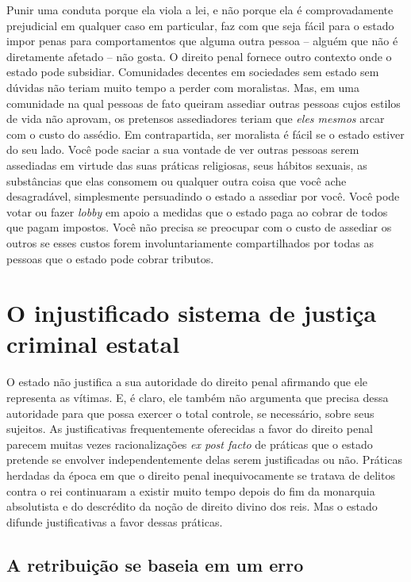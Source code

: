 Punir uma conduta porque ela viola a lei, e não porque ela é comprovadamente prejudicial em qualquer caso em particular, faz com que seja fácil para o estado impor penas para comportamentos que alguma outra pessoa -- alguém que não é diretamente afetado -- não gosta. O direito penal fornece outro contexto onde o estado pode subsidiar. Comunidades decentes em sociedades sem estado sem dúvidas não teriam muito tempo a perder com moralistas. Mas, em uma comunidade na qual pessoas de fato queiram assediar outras pessoas cujos estilos de vida não aprovam, os pretensos assediadores teriam que \emph{eles mesmos} arcar com o custo do assédio. Em contrapartida, ser moralista é fácil se o estado estiver do seu lado. Você pode saciar a sua vontade de ver outras pessoas serem assediadas em virtude das suas práticas religiosas, seus hábitos sexuais, as substâncias que elas consomem ou qualquer outra coisa que você ache desagradável, simplesmente persuadindo o estado a assediar por você. Você pode votar ou fazer \emph{lobby} em apoio a medidas que o estado paga ao cobrar de todos que pagam impostos. Você não precisa se preocupar com o custo de assediar os outros se esses custos forem involuntariamente compartilhados por todas as pessoas que o estado pode cobrar tributos.

\section{O injustificado sistema de justiça criminal estatal}

O estado não justifica a sua autoridade do direito penal afirmando que ele representa as vítimas. E, é claro, ele também não argumenta que precisa dessa autoridade para que possa exercer o total controle, se necessário, sobre seus sujeitos. As justificativas frequentemente oferecidas a favor do direito penal parecem muitas vezes racionalizações \emph{ex post facto} de práticas que o estado pretende se envolver independentemente delas serem justificadas ou não. Práticas herdadas da época em que o direito penal inequivocamente se tratava de delitos contra o rei continuaram a existir muito tempo depois do fim da monarquia absolutista e do descrédito da noção de direito divino dos reis. Mas o estado difunde justificativas a favor dessas práticas.

\subsection*{A retribuição se baseia em um erro}

